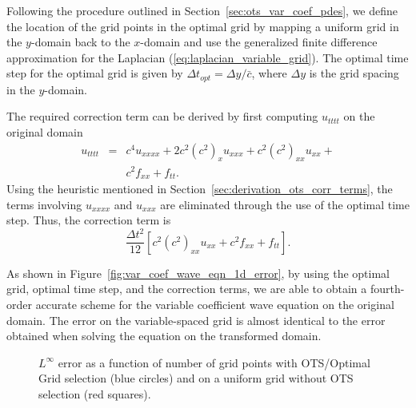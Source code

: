 \documentclass[twocolumn]{article} %
\newcommand{\beq}{\begin{equation}}
\newcommand{\eeq}{\end{equation}}
\newcommand{\bea}{\begin{eqnarray}}
\newcommand{\eea}{\end{eqnarray}}
\def\cbar{\bar{c}}
\def\dt{\Delta t}
\def\dy{\Delta y}
\begin{document}
Following the procedure outlined in Section~\ref{sec:ots_var_coef_pdes}, we 
define the location of the grid points in the optimal grid by mapping
a uniform grid in the $y$-domain back to the $x$-domain and use 
the generalized finite difference approximation for the Laplacian 
(\ref{eq:laplacian_variable_grid}).  The optimal time step for the optimal
grid is given by $\dt_{opt} = \dy/\cbar$, where $\dy$ is the grid spacing 
in the $y$-domain.

The required correction term can be derived by first computing $u_{tttt}$ on 
the original domain
\bea
  u_{tttt} & = & 
    c^4 u_{xxxx} + 2 c^2 (c^2)_x u_{xxx} 
    + c^2 (c^2)_{xx} u_{xx} + \nonumber \\ 
& & c^2 f_{xx} + f_{tt}.
\eea
Using the heuristic mentioned in Section~\ref{sec:derivation_ots_corr_terms},
the terms involving $u_{xxxx}$ and $u_{xxx}$ are eliminated through the use 
of the optimal time step.  Thus, the correction term is
\beq
  \frac{\dt^2}{12} \left[ c^2 (c^2)_{xx} u_{xx} + c^2 f_{xx} + f_{tt} \right].
\eeq

As shown in Figure~\ref{fig:var_coef_wave_eqn_1d_error}, by using the optimal 
grid, optimal time step, and the correction terms, we are able to obtain a 
fourth-order accurate scheme for the variable coefficient wave equation on
the original domain.  The error on the variable-spaced grid is almost 
identical to the error obtained when solving the equation on the transformed 
domain. 


\begin{figure}[thb]
\begin{center}
\caption{$L^\infty$ error as a function of number of grid points with 
OTS/Optimal Grid selection (blue circles) and on a uniform grid without 
OTS selection (red squares).
}
\label{fig:var_coef_diffusion_eqn_1d_error}
\end{center}
\end{figure}
\end{document}
